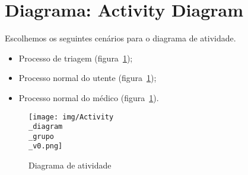 
\section{Diagrama: Activity Diagram}

\begin{minipage}{\linewidth}
Escolhemos os seguintes cenários para o diagrama de atividade.
\begin{itemize}
	\item Processo de triagem (figura~\ref{fig:adg3150});
	\item Processo normal do utente (figura~\ref{fig:adg3150});
	\item Processo normal do médico (figura~\ref{fig:adg3150}).
\end{itemize}
\end{minipage}

\begin{figure}[htb]
	\centering
	\texttt{[image: img/Activity\\\_diagram\\\_grupo\\\_v0.png]}  %
	\caption{Diagrama de atividade}
	\label{fig:adg3150}
\end{figure}

